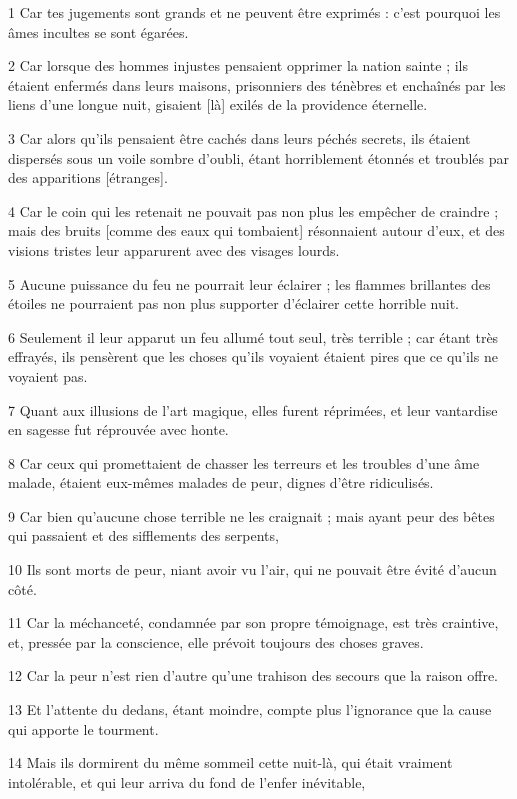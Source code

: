 
\par 1 Car tes jugements sont grands et ne peuvent être exprimés : c'est pourquoi les âmes incultes se sont égarées.
\par 2 Car lorsque des hommes injustes pensaient opprimer la nation sainte ; ils étaient enfermés dans leurs maisons, prisonniers des ténèbres et enchaînés par les liens d'une longue nuit, gisaient [là] exilés de la providence éternelle.
\par 3 Car alors qu'ils pensaient être cachés dans leurs péchés secrets, ils étaient dispersés sous un voile sombre d'oubli, étant horriblement étonnés et troublés par des apparitions [étranges].
\par 4 Car le coin qui les retenait ne pouvait pas non plus les empêcher de craindre ; mais des bruits [comme des eaux qui tombaient] résonnaient autour d'eux, et des visions tristes leur apparurent avec des visages lourds.
\par 5 Aucune puissance du feu ne pourrait leur éclairer ; les flammes brillantes des étoiles ne pourraient pas non plus supporter d'éclairer cette horrible nuit.
\par 6 Seulement il leur apparut un feu allumé tout seul, très terrible ; car étant très effrayés, ils pensèrent que les choses qu'ils voyaient étaient pires que ce qu'ils ne voyaient pas.
\par 7 Quant aux illusions de l'art magique, elles furent réprimées, et leur vantardise en sagesse fut réprouvée avec honte.
\par 8 Car ceux qui promettaient de chasser les terreurs et les troubles d'une âme malade, étaient eux-mêmes malades de peur, dignes d'être ridiculisés.
\par 9 Car bien qu'aucune chose terrible ne les craignait ; mais ayant peur des bêtes qui passaient et des sifflements des serpents,
\par 10 Ils sont morts de peur, niant avoir vu l'air, qui ne pouvait être évité d'aucun côté.
\par 11 Car la méchanceté, condamnée par son propre témoignage, est très craintive, et, pressée par la conscience, elle prévoit toujours des choses graves.
\par 12 Car la peur n'est rien d'autre qu'une trahison des secours que la raison offre.
\par 13 Et l'attente du dedans, étant moindre, compte plus l'ignorance que la cause qui apporte le tourment.
\par 14 Mais ils dormirent du même sommeil cette nuit-là, qui était vraiment intolérable, et qui leur arriva du fond de l'enfer inévitable,
